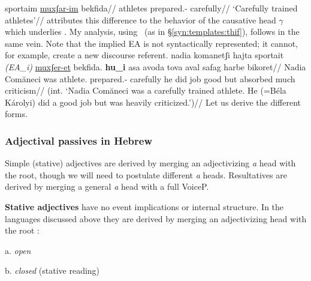 	\a \begingl
		\gla\rightcomment{(\mhuf)}sportaim \underline{muxʃar-im} bekfida//
		\glb athletes prepared.- carefully//
		\glft `Carefully trained athletes'//
	\endgl
\xe
\cite{doron14adj} attributes this difference to the behavior of the causative head $\gamma$ which underlies \thif. My analysis, using \vd~(as in \S\ref{syn:templates:thif}), follows in the same vein. Note that the implied EA is not syntactically represented; it cannot, for example, create a new discourse referent.
\ex\label{ex:sportait} \ljudge{*}
	\begingl
		\gla nadia komanetʃi hajta sportait \emph{(EA_i)} \underline{muxʃer-et} bekfida. \textbf{hu_i} asa avoda tova aval safag harbe bikoret//
		\glb Nadia Com\u{a}neci was athlete. {} prepared.- carefully he did job good but absorbed much criticism//
		\glft (int. `Nadia Com\u{a}neci was a carefully trained athlete. He (=B\'ela K\'arolyi) did a good job but was heavily criticized.')//
	\endgl
\xe
Let us derive the different forms.

      \subsubsection{Adjectival passives in Hebrew}
Simple (stative) adjectives are derived by merging an adjectivizing \emph{a} head with the root, though we will need to postulate different \emph{a} heads. Resultatives are derived by merging a general \emph{a} head with a full VoiceP.

\textbf{Stative adjectives} have no event implications or internal structure. In the languages discussed above they are derived by merging an adjectivizing head with the root \citep{embick04li}:
\ex\label{ex:adj-en}
	\begin{minipage}[t]{0.3\textwidth}
		a. \emph{open}\\
	\end{minipage}
	\begin{minipage}[t]{0.3\textwidth}
		b. \emph{closed} (stative reading)\\
	\end{minipage}
\xe

